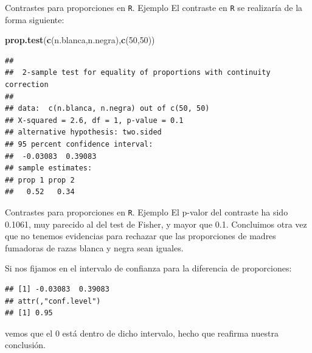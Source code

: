 \documentclass[
  ignorenonframetext,
]{beamer}
\newenvironment{Shaded}{\begin{snugshade}}{\end{snugshade}}
\newcommand{\DecValTok}[1]{\textcolor[rgb]{0.00,0.00,0.81}{#1}}
\newcommand{\KeywordTok}[1]{\textcolor[rgb]{0.13,0.29,0.53}{\textbf{#1}}}
\newcommand{\NormalTok}[1]{#1}
\newcommand{\OperatorTok}[1]{\textcolor[rgb]{0.81,0.36,0.00}{\textbf{#1}}}
\begin{document}
\begin{frame}[fragile]{Contrastes para proporciones en \texttt{R}.
Ejemplo}
\protect\hypertarget{contrastes-para-proporciones-en-r.-ejemplo-2}{}
El contraste en \texttt{R} se realizaría de la forma siguiente:

\begin{Shaded}
\begin{Highlighting}[]
\KeywordTok{prop.test}\NormalTok{(}\KeywordTok{c}\NormalTok{(n.blanca,n.negra),}\KeywordTok{c}\NormalTok{(}\DecValTok{50}\NormalTok{,}\DecValTok{50}\NormalTok{))}
\end{Highlighting}
\end{Shaded}

\begin{verbatim}
## 
##  2-sample test for equality of proportions with continuity correction
## 
## data:  c(n.blanca, n.negra) out of c(50, 50)
## X-squared = 2.6, df = 1, p-value = 0.1
## alternative hypothesis: two.sided
## 95 percent confidence interval:
##  -0.03083  0.39083
## sample estimates:
## prop 1 prop 2 
##   0.52   0.34
\end{verbatim}
\end{frame}

\begin{frame}[fragile]{Contrastes para proporciones en \texttt{R}.
Ejemplo}
\protect\hypertarget{contrastes-para-proporciones-en-r.-ejemplo-3}{}
El p-valor del contraste ha sido 0.1061, muy parecido al del test de
Fisher, y mayor que 0.1. Concluimos otra vez que no tenemos evidencias
para rechazar que las proporciones de madres fumadoras de razas blanca y
negra sean iguales.

Si nos fijamos en el intervalo de confianza para la diferencia de
proporciones:

\begin{Shaded}
\end{Shaded}

\begin{verbatim}
## [1] -0.03083  0.39083
## attr(,"conf.level")
## [1] 0.95
\end{verbatim}

vemos que el 0 está dentro de dicho intervalo, hecho que reafirma
nuestra conclusión.
\end{frame}
\end{document}
